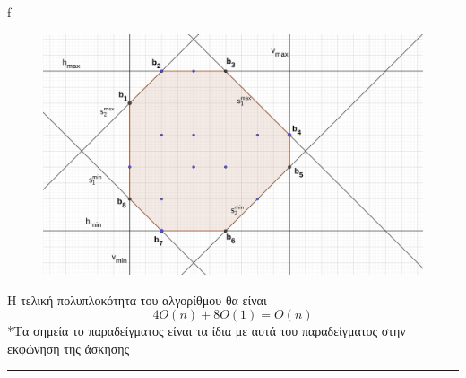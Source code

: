 f\documentclass[12pt]{article}
\begin{document}
\begin{enumerate}
\begin{figure}[H]
            \centering
            \includegraphics[scale = 1]{geogebra-export9.png}
        \end{figure}
    Η τελική πολυπλοκότητα του αλγορίθμου θα είναι 
    $$4O(n)+8O(1) = O(n)$$
    *Tα σημεία το παραδείγματος είναι τα ίδια με αυτά του παραδείγματος στην εκφώνηση της άσκησης
\end{enumerate} 
\rule{\textwidth}{.5pt}
\end{document}
